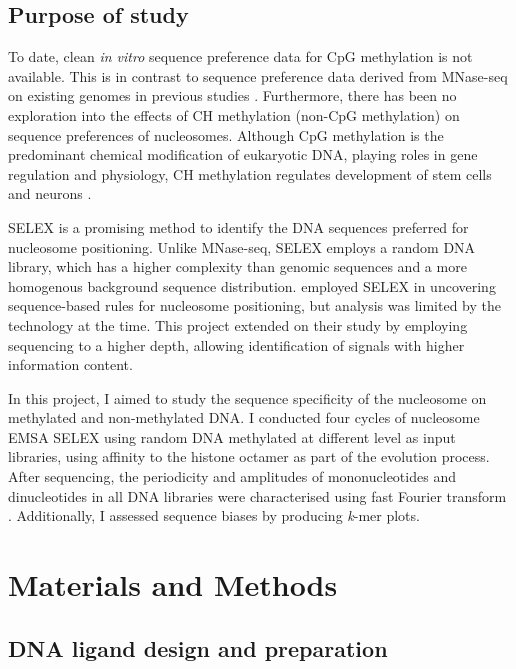 \documentclass[parskip=full, numbers=noenddot]{scrreprt}
\begin{document}
\subsection{Purpose of study}
\label{ssec:emsaselex_intro_why}

To date, clean \emph{in vitro} sequence preference data for CpG methylation is not available.  This is in contrast to sequence preference data derived from MNase-seq on existing genomes in previous studies \citep{struhl_determinants_2013, segal_genomic_2006, huff_dnmt1-independent_2014}.  Furthermore, there has been no exploration into the effects of CH methylation (non-CpG methylation) on sequence preferences of nucleosomes.  Although CpG methylation is the predominant chemical modification of eukaryotic DNA, playing roles in gene regulation and physiology, CH methylation regulates development of stem cells and neurons \citep{guo_distribution_2014}.

SELEX is a promising method to identify the DNA sequences preferred for nucleosome positioning.  Unlike MNase-seq, SELEX employs a random DNA library, which has a higher complexity than genomic sequences and a more homogenous background sequence distribution.  \citet{lowary_new_1998} employed SELEX in uncovering sequence-based rules for nucleosome positioning, but analysis was limited by the technology at the time.  This project extended on their study by employing sequencing to a higher depth, allowing identification of signals with higher information content.

In this project, I aimed to study the sequence specificity of the nucleosome on methylated and non-methylated DNA.  I conducted four cycles of nucleosome EMSA SELEX using random DNA methylated at different level as input libraries, using affinity to the histone octamer as part of the evolution process.  After sequencing, the periodicity and amplitudes of mononucleotides and dinucleotides in all DNA libraries were characterised using fast Fourier transform \citep{lowary_new_1998, zhu_interaction_2018}.  Additionally, I assessed sequence biases by producing \emph{k}-mer plots.

\section{Materials and Methods}
\label{sec:emsaselex_methods}

\subsection{DNA ligand design and preparation}
\label{ssec:emsaselex_methods_lig}
\end{document}
